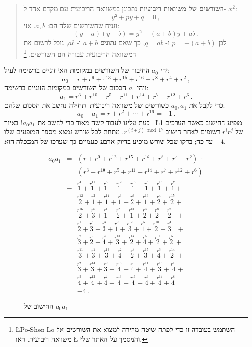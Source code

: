 \documentclass[11pt,a4paper]{article}
\newenvironment{form}[1]{%
\begin{displaymath}%
\renewcommand{\arraystretch}{#1}%
\begin{array}{lcl}}%
{\end{array}%
\end{displaymath}%
}
\newcommand*{\occ}[2]{%
  \stackrel{%
    \textstyle r^{#1}}%
    {\!\!\!\scriptscriptstyle #2}}
\begin{document}
\begin{quote}
\textbf{%
השורשים של משוואות ריבועיות%
}
נתבונן במשוואה הריבועית עם מקדם אחד ל-%
$x^2$:
\[
y^2+py+q=0\,,
\]
ונניח שהשורשים שלה הם:
$a,b$.
אזי:
\[
(y-a)(y-b)=y^2 - (a+b)y + ab\,.
\]
לכן
$p=-(a+b)$
ו-%
$q=ab$,
כך שאם
\textbf{נתונים}
$a+b$
ו-%
$ab$,
נוכל לרשום את המשוואה הריבועית עבורה הם השורשים.%
\footnote{%
\L{Po-Shen Lo}
השתמש בעובדה זו כדי לפתח שיטה מהירה למצוא את השורשים אל משוואה ריבועית. ראו
\L{\cite{lo}}
והמסמך על האתר שלי.
}
\end{quote}
יהי
$a_0$
החיבור של השורשים במקומות האי-זוגיים ברשימה לעיל:
\[
a_0=r + r^9 + r^{13} +r^{15} +r^{16} + r^8+r^4+r^2\,,
\]
ויהי
$a_1$
הסכום של השורשים במקומות הזוגיים ברשימה:
\[
a_1=r^3 + r^{10} + r^{5} +r^{11} +r^{14} + r^7+r^{12}+r^6\,.
\]
כדי לקבל את
$a_0,a_1$
כשורשים של משוואה ריבועית. תחילה נחשב את הסכום שלהם:
\[
a_0+a_1=r + r^2 + \cdots +r^{16}=-1\,.
\]
כעת עלינו לעבוד קשה מאוד כדי לחשב את
$a_0a_1$!
באיור%
~\L{\ref{fig.a0a1}}
מופיע החישוב כאשר הערכים של
$r^ir^j$
רשומים לאחר חישוב
$r^{(i+j) \bmod 17}$.
מתחת לכל שורש נמצא מספר המופעים שלו עד כה;
בדקו שכל שורש מופיע בדיוק ארבע פעמיים כך שערכו של המכפלה הוא 
$-4$.
\begin{figure}[tb]
\begin{form}{1.5}
a_0a_1&=&(r + r^9 + r^{13} +r^{15} +r^{16} + r^8+r^4+r^2)\;\cdot\\
&&(r^3 + r^{10} + r^{5} +r^{11} +r^{14} + r^7+r^{12}+r^6)\\
&=&\occ{4}{1} + \occ{11}{1} + \occ{6}{1} + \occ{12}{1} + \occ{15}{1} + \occ{8}{1} + \occ{13}{1} + \occ{7}{1} +\\

&&\occ{12}{2} + \occ{2}{1} + \occ{14}{1} + \occ{3}{1} + \occ{6}{2} + \occ{16}{1} + \occ{4}{2} + \occ{15}{2} +\\

&&\occ{16}{2} + \occ{6}{3} + \occ{1}{1} + \occ{7}{2} + \occ{10}{1} + \occ{3}{2} + \occ{8}{2} + \occ{2}{2}\;\;\: +\\

&&\occ{1}{2} + \occ{8}{3} + \occ{3}{3} + \occ{9}{1} + \occ{12}{3} + \occ{5}{1} + \occ{10}{2} + \occ{4}{3}\;\;\: +\\

&&\occ{2}{3} + \occ{9}{2} + \occ{4}{4} + \occ{10}{3} + \occ{13}{2} + \occ{6}{4} + \occ{11}{2} + \occ{5}{2} \:+\\

&&\occ{11}{3} + \occ{1}{3} + \occ{13}{3} + \occ{2}{4} + \occ{5}{2} + \occ{15}{3} + \occ{3}{4} + \occ{14}{2} \;+\\

&&\occ{7}{3} + \occ{14}{3} + \occ{9}{3} + \occ{15}{4} + \occ{1}{4} + \occ{11}{4} + \occ{16}{3} + \occ{10}{4} +\\

&&\occ{5}{4} + \occ{12}{4} + \occ{7}{4} + \occ{13}{4} + \occ{16}{4} + \occ{9}{4} + \occ{14}{4} + \occ{8}{4}\\
&=&-4\,.
\end{form}\vspace{-2em}
\caption{החישוב של $a_0a_1$}\label{fig.a0a1}
\end{figure}
\end{document}
